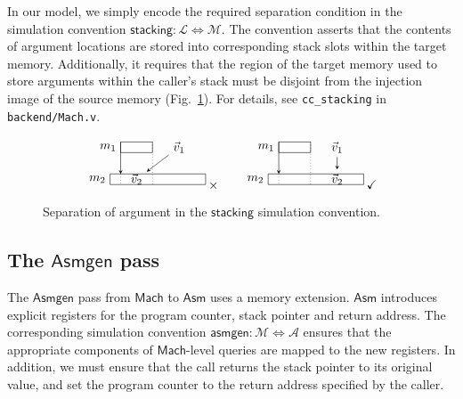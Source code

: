 \documentclass[sigplan,screen]{acmart}
\newcommand{\kw}[1]{\ensuremath{ \mathsf{#1} }}
\newenvironment{optional}{}{}
\begin{document}
\begin{optional}
In our model,
we simply encode the required separation condition
in the simulation convention
$\kw{stacking} : \mathcal{L} \Leftrightarrow \mathcal{M}$.
The convention
asserts that the contents of argument locations
are stored into corresponding stack slots
within the target memory.
Additionally, it
requires that the region of the target memory
used to store arguments within the caller's stack
must be disjoint from the injection image of the source memory
(Fig.~\ref{fig:stacking}).
For details,
see \texttt{cc\_stacking} in \texttt{backend/Mach.v}.

\begin{figure}
\[
  \begin{tikzpicture}[scale=0.3,>=stealth]
    \draw ( 1,3) rectangle +(3,1); \node[left] at (1,3.5) {$m_1$};
    \draw ( 0,0) rectangle +(9,1); \node[left] at (0,0.5) {$m_2$};
    \node (V1) at (6.5,3.5) {$\vec{v}_1$};
    \node (V2) at (2.5,0.5) {$\vec{v}_2$};
    \draw[->] (1,4) -- (1,1); \draw[dotted] (1,1) -- (1,0); \draw[dotted] (4,4) -- (4,0);
    \draw[->] (V1) -- (V2);
  \end{tikzpicture}
  \:{\times}
  \qquad
  \begin{tikzpicture}[scale=0.3,>=stealth]
    \draw ( 1,3) rectangle +(3,1); \node[left] at (1,3.5) {$m_1$};
    \draw ( 0,0) rectangle +(9,1); \node[left] at (0,0.5) {$m_2$};
    \node (V1) at (6.5,3.5) {$\vec{v}_1$};
    \node (V2) at (6.5,0.5) {$\vec{v}_2$};
    \draw[->] (1,4) -- (1,1); \draw[dotted] (1,1) -- (1,0); \draw[dotted] (4,4) -- (4,0);
    \draw[->] (V1) -- (V2);
  \end{tikzpicture}
  \:{\checkmark}
\]
  \caption{Separation of argument
    in the \kw{stacking} simulation convention.}
  \label{fig:stacking}
\end{figure}


\subsection{The \kw{Asmgen} pass} \label{sec:asmgen} %

The \kw{Asmgen} pass from \kw{Mach} to \kw{Asm}
uses a memory extension.
\kw{Asm} introduces explicit registers for the
program counter, stack pointer and return address.
The corresponding simulation convention
$\kw{asmgen} : \mathcal{M} \Leftrightarrow \mathcal{A}$
ensures that the appropriate components of
\kw{Mach}-level queries are mapped to the new registers.
In addition,
we must ensure that the call returns the stack pointer
to its original value,
and set the program counter to the return address
specified by the caller.


\end{optional}
\end{document}
